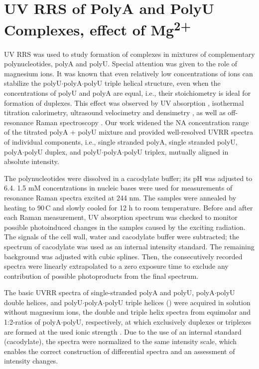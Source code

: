\section[\texorpdfstring{%
    UV RRS of PolyA and PolyU Complexes, effect of Mg\textsuperscript{2+}
}{%
    UV RRS of PolyA and PolyU Complexes, effect of
		Mg\texttwosuperior\textplussuperior
}]{%
    UV RRS of PolyA and PolyU Complexes, effect of Mg\textsuperscript{2+}
}%

UV RRS was used to study formation of complexes in mixtures of complementary
polynucleotides, polyA and polyU.
Special attention was given to the role of magnesium ions.
It was known that even relatively low concentrations of 
ions can stabilize the polyU$\cdot$polyA$\cdot$polyU triple helical structure,
even when the concentrations of polyU and polyA are equal, i.e., their
stoichiometry is ideal for formation of duplexes.
This effect was observed by UV absorption
\parencite{%
	Kankia2003,%
	Sorokin2003%
},
isothermal titration calorimetry, ultrasound velocimetry and densimetry
\parencite{Kankia2003},
as well as off-resonance Raman spectroscopy
\parencite{Herrera2010}.
Our work widened the NA concentration range of the  titrated
polyA + polyU mixture and provided well-resolved UVRR spectra of individual
components, i.e., single stranded polyA, single stranded polyU,
polyA$\cdot$polyU duplex, and polyU$\cdot$polyA$\cdot$polyU triplex, mutually
aligned in absolute intensity.

The polynucleotides were dissolved in a cacodylate buffer; its pH was adjusted
to 6.4.
1.5 mM concentrations in nucleic bases were used for measurements of resonance
Raman spectra excited at 244 nm.
The samples were annealed by heating to 90\,\textdegree{}C and slowly cooled
for 12 h to room temperature.
Before and after each Raman measurement, UV absorption spectrum was checked to
monitor possible photoinduced changes in the samples caused by the exciting
radiation.
The signals of the cell wall, water and cacodylate buffer were subtracted; the
spectrum of cacodylate was used as an internal intensity standard.
The remaining background was adjusted with cubic splines.
Then, the consecutively recorded spectra were linearly extrapolated to a zero
exposure time to exclude any contribution of possible photoproducts from the
final spectrum.

The basic UVRR spectra of single-stranded polyA and polyU, polyA$\cdot$polyU
double helices, and polyU$\cdot$polyA$\cdot$polyU triple helices
()
were acquired in solution without magnesium ions, the double and triple helix
spectra from equimolar and 1:2-ratios of polyA$\cdot$polyU, respectively, at
which exclusively duplexes or triplexes are formed at the used ionic strength
\parencite{Stevens1964}.
Due to the use of an internal standard (cacodylate), the spectra were
normalized to the same intensity scale, which enables the correct construction
of differential spectra and an assessment of intensity changes.

